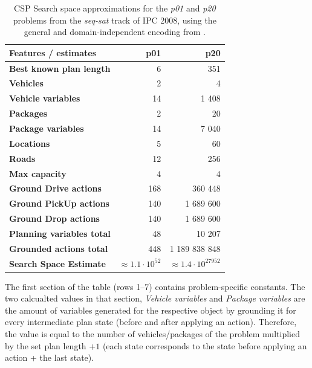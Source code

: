 \begin{table}[tb]
\begin{center}
\begin{tabular}{l||rr}
\textbf{Features / estimates} & \textbf{p01} & \textbf{p20} \\ 
\hline 
\hline 
\textbf{Best known plan length} & 6 & 351 \\ 
\textbf{Vehicles} & 2 & 4 \\ 
\textbf{Vehicle variables} & 14 & 1 408 \\ 
\textbf{Packages} & 2 & 20 \\ 
\textbf{Package variables} & 14 & 7 040 \\ 
\textbf{Locations} & 5 & 60 \\ 
\textbf{Roads} & 12 & 256 \\
\textbf{Max capacity} & 4 & 4 \\ 
\hline
\textbf{Ground Drive actions} & 168 & 360 448 \\ 
\textbf{Ground PickUp actions} & 140 & 1 689 600 \\ 
\textbf{Ground Drop actions} & 140 & 1 689 600 \\ 
\hline 
\textbf{Planning variables total} & 48 & 10 207 \\ 
\textbf{Grounded actions total} & 448 & 1 189 838 848 \\ 
\textbf{Search Space Estimate} & $\approx 1.1 \cdot 10^{52}$ & $\approx 1.4 \cdot 10^{27 952}$ \\ %
\end{tabular}
\end{center}
\caption{CSP Search space approximations for the \textit{p01} and \textit{p20} problems from the \textit{seq-sat} track of IPC 2008, using the general and domain-independent encoding from \citet[Section~8.3]{Ghallab2004}.}
\label{tab:csp-trivial}
\end{table}

The first section of the table (rows 1--7) contains problem-specific constants.
The two calcualted values in that section, \textit{Vehicle variables} and \textit{Package variables} are the amount of variables generated for the respective
object by grounding it for every intermediate plan state (before and after applying an action). Therefore, the value is equal to the number of vehicles/packages of the problem
multiplied by the set plan length $+ 1$ (each state corresponds to the state before applying an action + the last state).

